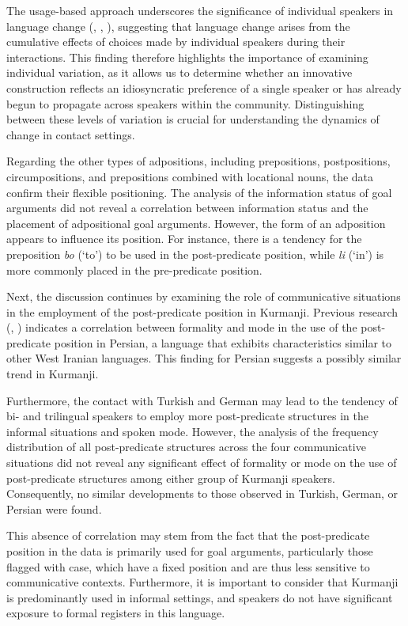 The usage-based approach underscores the significance of individual speakers in language change (\citealt{Bybee2006}, \citealt{Ansaldo2009}, \citealt{Matras2020}), suggesting that language change arises from the cumulative effects of choices made by individual speakers during their interactions. This finding therefore highlights the importance of examining individual variation, as it allows us to determine whether an innovative construction reflects an idiosyncratic preference of a single speaker or has already begun to propagate across speakers within the community. Distinguishing between these levels of variation is crucial for understanding the dynamics of change in contact settings.

Regarding the other types of adpositions, including prepositions, postpositions, circumpositions, and prepositions combined with locational nouns, the data confirm their flexible positioning. The analysis of the information status of goal arguments did not reveal a correlation between information status and the placement of adpositional goal arguments. However, the form of an adposition appears to influence its position. For instance, there is a tendency for the preposition \textit{bo} (‘to’) to be used in the post-predicate position, while \textit{li} (‘in’) is more commonly placed in the pre-predicate position.

Next, the discussion continues by examining the role of communicative situations in the employment of the post-predicate position in Kurmanji. Previous research (\citealt{Frommer1981}, \citealt{Haig_post-predicate_EtAl2024-1}) indicates a correlation between formality and mode in the use of the post-predicate position in Persian, a language that exhibits characteristics similar to other West Iranian languages. This finding for Persian suggests a possibly similar trend in Kurmanji.

Furthermore, the contact with Turkish and German may lead to the tendency of bi- and trilingual speakers to employ more post-predicate structures in the informal situations and spoken mode. However, the analysis of the frequency distribution of all post-predicate structures across the four communicative situations did not reveal any significant effect of formality or mode on the use of post-predicate structures among either group of Kurmanji speakers. Consequently, no similar developments to those observed in Turkish, German, or Persian were found.

This absence of correlation may stem from the fact that the post-predicate position in the data is primarily used for goal arguments, particularly those flagged with case, which have a fixed position and are thus less sensitive to communicative contexts. Furthermore, it is important to consider that Kurmanji is predominantly used in informal settings, and speakers do not have significant exposure to formal registers in this language.

